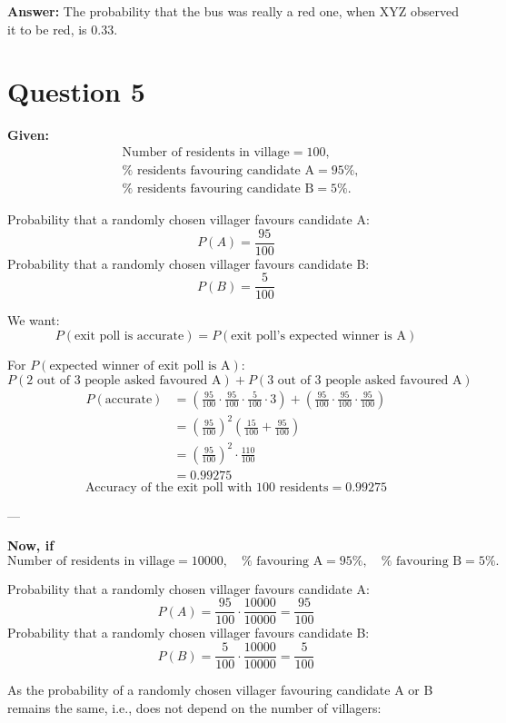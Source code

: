 \documentclass[12pt]{article}
\begin{document}
\noindent
\textbf{Answer:} The probability that the bus was really a red one, when XYZ observed it to be red, is $0.33$.
\section{Question 5}
\textbf{Given:}
\[
\begin{aligned}
&\text{Number of residents in village} = 100, \\
&\%\text{ residents favouring candidate A} = 95\%, \\
&\%\text{ residents favouring candidate B} = 5\%.
\end{aligned}
\]

Probability that a randomly chosen villager favours candidate A:
\[
P(A) = \frac{95}{100}
\]
Probability that a randomly chosen villager favours candidate B:
\[
P(B) = \frac{5}{100}
\]

We want:
\[
P(\text{exit poll is accurate}) = P(\text{exit poll's expected winner is A})
\]

\noindent For $P(\text{expected winner of exit poll is A})$:
\[
P(\text{2 out of 3 people asked favoured A}) + P(\text{3 out of 3 people asked favoured A})
\]
\begin{align*}
P(\text{accurate}) 
&= \left(\frac{95}{100} \cdot \frac{95}{100} \cdot \frac{5}{100} \cdot 3\right) 
  + \left( \frac{95}{100} \cdot \frac{95}{100} \cdot \frac{95}{100} \right) \\
&= \left(\frac{95}{100}\right)^2 \left( \frac{15}{100} + \frac{95}{100} \right) \\
&= \left(\frac{95}{100}\right)^2 \cdot \frac{110}{100} \\
&= 0.99275
\end{align*}
\[
\boxed{\text{Accuracy of the exit poll with 100 residents} = 0.99275}
\]

---

\noindent \textbf{Now, if}
\[
\text{Number of residents in village} = 10000, \quad
\%\text{ favouring A} = 95\%, \quad
\%\text{ favouring B} = 5\%.
\]

Probability that a randomly chosen villager favours candidate A:
\[
P(A) = \frac{95}{100} \cdot \frac{10000}{10000} = \frac{95}{100}
\]
Probability that a randomly chosen villager favours candidate B:
\[
P(B) = \frac{5}{100} \cdot \frac{10000}{10000} = \frac{5}{100}
\]

As the probability of a randomly chosen villager favouring candidate A or B remains the same, i.e., does not depend on the number of villagers:
\end{document}

